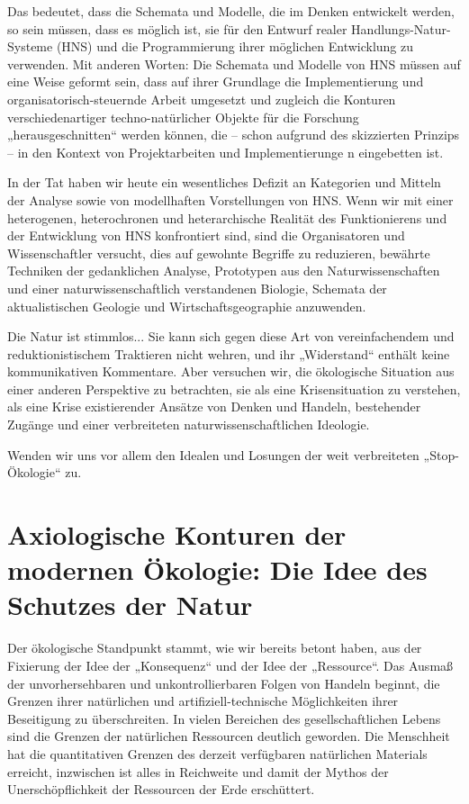 \documentclass[11pt,a4paper]{article}
\begin{document}
Das bedeutet, dass die Schemata und Modelle, die im Denken entwickelt werden,
so sein müssen, dass es möglich ist, sie für den Entwurf realer
Handlungs-Natur-Systeme (HNS) und die Programmierung ihrer möglichen
Entwicklung zu verwenden.  Mit anderen Worten: Die Schemata und Modelle von
HNS müssen auf eine Weise geformt sein, dass auf ihrer Grundlage die
Implementierung und organisatorisch-steuernde Arbeit umgesetzt und zugleich
die Konturen verschiedenartiger techno-natürlicher Objekte für die Forschung
„herausgeschnitten“ werden können, die -- schon aufgrund des skizzierten
Prinzips -- in den Kontext von Projektarbeiten und Implementierunge n
eingebetten ist.

In der Tat haben wir heute ein wesentliches Defizit an Kategorien und Mitteln
der Analyse sowie von modellhaften Vorstellungen von HNS. Wenn wir mit einer
heterogenen, heterochronen und heterarchische Realität des Funktionierens und
der Entwicklung von HNS konfrontiert sind, sind die Organisatoren und
Wissenschaftler versucht, dies auf gewohnte Begriffe zu reduzieren, bewährte
Techniken der gedanklichen Analyse, Prototypen aus den Naturwissenschaften und
einer naturwissenschaftlich verstandenen Biologie, Schemata der
aktualistischen Geologie und Wirtschaftsgeographie anzuwenden.

Die Natur ist stimmlos... Sie kann sich gegen diese Art von vereinfachendem
und reduktionistischem Traktieren nicht wehren, und ihr „Widerstand“ enthält
keine kommunikativen Kommentare. Aber versuchen wir, die ökologische Situation
aus einer anderen Perspektive zu betrachten, sie als eine Krisensituation zu
verstehen, als eine Krise existierender Ansätze von Denken und Handeln,
bestehender Zugänge und einer verbreiteten naturwissenschaftlichen Ideologie.

Wenden wir uns vor allem den Idealen und Losungen der weit verbreiteten
„Stop-Ökologie“ zu.

\section{Axiologische Konturen der modernen Ökologie: Die Idee des Schutzes
  der Natur}

Der ökologische Standpunkt stammt, wie wir bereits betont haben, aus der
Fixierung der Idee der „Konsequenz“ und der Idee der „Ressource“. Das Ausmaß
der unvorhersehbaren und unkontrollierbaren Folgen von Handeln beginnt, die
Grenzen ihrer natürlichen und artifiziell-technische Möglichkeiten ihrer
Beseitigung zu überschreiten. In vielen Bereichen des gesellschaftlichen
Lebens sind die Grenzen der natürlichen Ressourcen deutlich geworden.  Die
Menschheit hat die quantitativen Grenzen des derzeit verfügbaren natürlichen
Materials erreicht, inzwischen ist alles in Reichweite und damit der Mythos
der Unerschöpf\-lichkeit der Ressourcen der Erde erschüttert.
\end{document}
